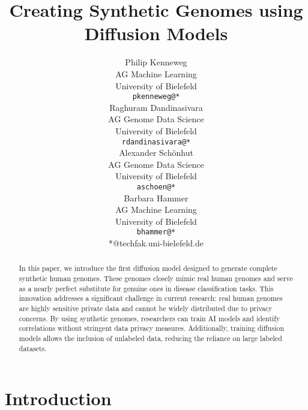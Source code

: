 \documentclass{article}
\title{Creating Synthetic Genomes using Diffusion Models}
\author{%
  Philip Kenneweg\\
  AG Machine Learning\\
  University of Bielefeld\\
  \texttt{pkenneweg@*} \\
  \And
  Raghuram Dandinasivara\\
  AG Genome Data Science\\
  University of Bielefeld\\
  \texttt{rdandinasivara@*} \\
  \And
  Alexander Schönhut\\
  AG Genome Data Science\\
  University of Bielefeld\\
  \texttt{aschoen@*}\\
  \And
  Barbara Hammer\\
  AG Machine Learning\\
  University of Bielefeld\\
  \texttt{bhammer@*}\\
  *@techfak.uni-bielefeld.de
}
\begin{document}
\maketitle


\begin{abstract}

In this paper, we introduce the first diffusion model designed to generate complete synthetic human genomes. These genomes closely mimic real human genomes and serve as a nearly perfect substitute for genuine ones in disease classification tasks. This innovation addresses a significant challenge in current research: real human genomes are highly sensitive private data and cannot be widely distributed due to privacy concerns. By using synthetic genomes, researchers can train AI models and identify correlations without stringent data privacy measures. Additionally, training diffusion models allows the inclusion of unlabeled data, reducing the reliance on large labeled datasets.


\end{abstract}


\section{Introduction}

\end{document}
